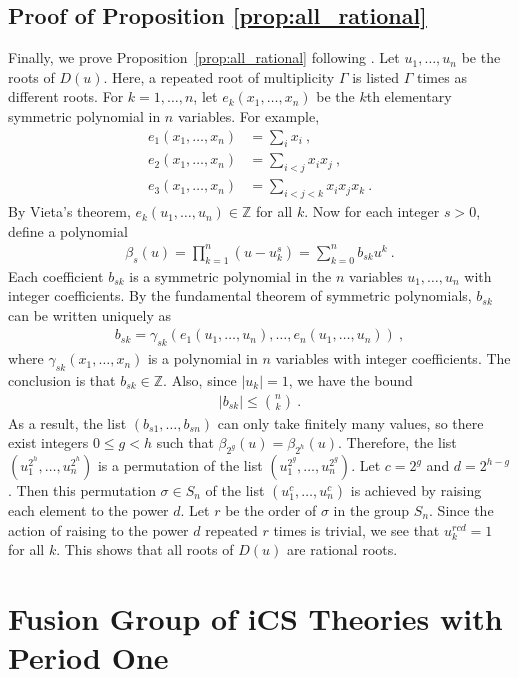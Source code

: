 \documentclass[aps,prb,twocolumn,superscriptaddress,floatfix,10pt,nofootinbib]{revtex4-2}
\newcommand{\ie}{\begin{equation}\begin{aligned}}
\newcommand{\fe}{\end{aligned}\end{equation}}
\theoremstyle{definition}
\begin{document}
\subsection{Proof of Proposition \ref{prop:all_rational}}\label{app:prop2}

Finally, we prove Proposition~\ref{prop:all_rational} following \cite{Kronecker1857}. Let $u_1,\ldots,u_n$ be the roots of $D(u)$. Here, a repeated root of multiplicity $\Gamma$ is listed $\Gamma$ times as different roots. For $k=1,\ldots,n$, let $e_k(x_1,\ldots,x_n)$ be the $k$th elementary symmetric polynomial in $n$ variables. For example,
\ie
e_1(x_1,\ldots,x_n)&=\sum_i x_i~,\\
e_2(x_1,\ldots,x_n)&=\sum_{i<j} x_ix_j~,\\
e_3(x_1,\ldots,x_n)&=\sum_{i<j<k} x_ix_jx_k~.
\fe
By Vieta's theorem, $e_k(u_1,\ldots,u_n)\in\mathbb{Z}$ for all $k$. Now for each integer $s>0$, define a polynomial
\ie
\beta_s(u)=\prod_{k=1}^n(u-u_k^s) =\sum_{k=0}^nb_{sk}u^k~.
\fe
Each coefficient $b_{sk}$ is a symmetric polynomial in the $n$ variables $u_1,\ldots,u_n$ with integer coefficients. By the fundamental theorem of symmetric polynomials, $b_{sk}$ can be written uniquely as
\ie
b_{sk}=\gamma_{sk}(e_1(u_1,\ldots,u_n),\ldots,e_n(u_1,\ldots,u_n))~,
\fe
where $\gamma_{sk}(x_1,\ldots,x_n)$ is a polynomial in $n$ variables with integer coefficients. The conclusion is that $b_{sk}\in\mathbb{Z}$. Also, since $|u_k|=1$, we have the bound
\ie
|b_{sk}|\le\binom{n}{k}~.
\fe
As a result, the list $(b_{s1},\ldots,b_{sn})$ can only take finitely many values, so there exist integers $0\le g<h$ such that $\beta_{2^g}(u)=\beta_{2^h}(u)$. Therefore, the list $(u_1^{2^h},\ldots,u_n^{2^h})$ is a permutation of the list $(u_1^{2^g},\ldots,u_n^{2^g})$. Let $c=2^g$ and $d=2^{h-g}$. Then this permutation $\sigma\in S_n$ of the list $(u_1^c,\ldots,u_n^c)$ is achieved by raising each element to the power $d$. Let $r$ be the order of $\sigma$ in the group $S_n$. Since the action of raising to the power $d$ repeated $r$ times is trivial, we see that $u_k^{rcd}=1$ for all $k$. This shows that all roots of $D(u)$ are rational roots.


\section{Fusion Group of iCS Theories with Period One}\label{app:one-form sym}
\end{document}
